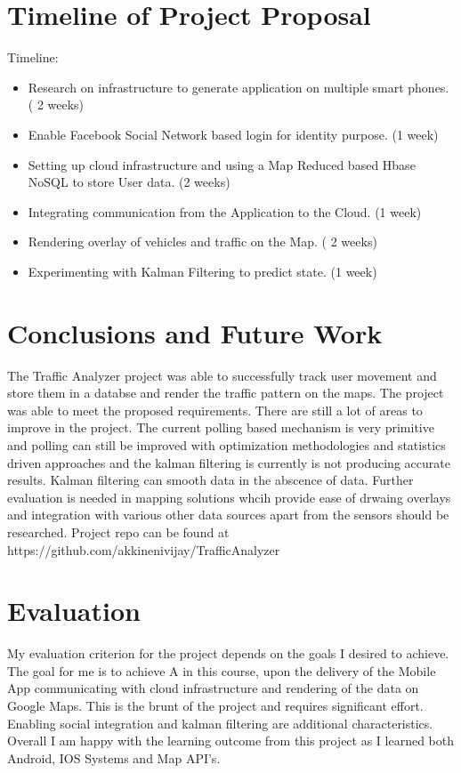 \documentclass[10pt]{sigplan-proc-varsize}
\begin{document}
\section{Timeline of Project Proposal}
Timeline:
\begin{itemize}
\item Research on infrastructure to generate application on multiple smart phones. ( 2 weeks)
\item Enable Facebook Social Network based login for identity purpose. (1 week)
\item Setting up cloud infrastructure and using a Map Reduced based Hbase NoSQL to store User data. (2 weeks)
\item Integrating communication from the Application to the Cloud. (1 week)
\item Rendering overlay of vehicles and traffic on the Map. ( 2 weeks)
\item Experimenting with Kalman Filtering to predict state. (1 week)
\end{itemize}

\section{Conclusions and Future Work}
 The Traffic Analyzer project was able to successfully track user movement and store them in a databse and render the traffic pattern on the maps. The project was able to meet the proposed requirements. There are still a lot of areas to improve in the project. The current polling based mechanism is very primitive and polling can still be improved with optimization methodologies and statistics driven approaches and the kalman filtering is currently is not producing accurate results. Kalman filtering can smooth data in the abscence of data. Further evaluation is needed in mapping solutions  whcih provide ease of drwaing overlays and integration with various other data sources apart from the sensors should be researched.  Project repo can be found at https://github.com/akkinenivijay/TrafficAnalyzer


\section{Evaluation}
My evaluation criterion for the project depends on the goals I desired to achieve. The goal for me is to achieve A in this course, upon the delivery of the Mobile App communicating with cloud infrastructure and rendering of the data on Google Maps. This is the brunt of the project and requires significant effort. Enabling social integration and kalman filtering are additional characteristics. Overall I am happy with the learning outcome from this project as I learned both Android, IOS Systems and Map API's.

\appendix
%
%


\end{document}

